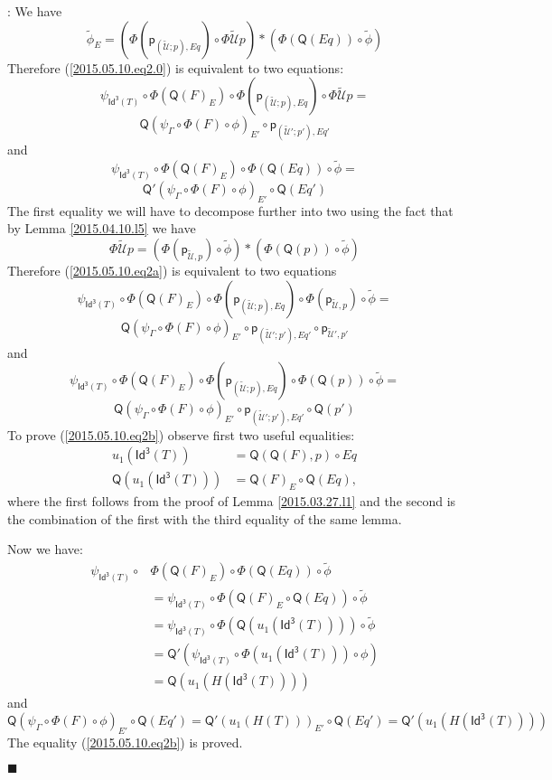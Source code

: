 \documentclass[12pt]{article}
\numberwithin{equation}{section}
\newenvironment{eq}{\begin{equation}}{\end{equation}}
\newenvironment{myproof}{{\bf Proof}:}{$\blacksquare$ \vskip 5mm }
\newcommand{\llabel}[1]{\label{#1}}
\newcommand{\wt}{\widetilde}
\newcommand{\p}{\mathsf{p}}
\newcommand{\Idx}{\mathsf{Id^3}} %
\newcommand{\U}{\mathcal{U}}
\newcommand{\Q}{\mathsf{Q}}
\begin{document}
\begin{myproof}
We have
%
$$\wt{\phi}_E=(\Phi(\p_{(\wt{\U};p),Eq})\circ
\Phi\wt{\U}p)*(\Phi(\Q(Eq))\circ\wt{\phi})$$
%
Therefore (\ref{2015.05.10.eq2.0}) is equivalent to two equations:
%
$$\psi_{\Idx(T)}\circ \Phi(\Q(F)_E)\circ \Phi(\p_{(\wt{\U};p),Eq})\circ
\Phi\wt{\U}p=$$
\begin{eq}
\label{2015.05.10.eq2a}
\Q(\psi_{\Gamma}\circ \Phi(F)\circ \phi)_{E'}\circ \p_{(\wt{\U}';p'),Eq'}
\end{eq}%
%
and
%
$$\psi_{\Idx(T)}\circ \Phi(\Q(F)_E)\circ \Phi(\Q(Eq))\circ\wt{\phi}=$$
\begin{eq}
\label{2015.05.10.eq2b}
\Q'(\psi_{\Gamma}\circ \Phi(F)\circ \phi)_{E'}\circ \Q(Eq')
\end{eq}%
%
The first equality we will have to decompose further into two using the fact
that by Lemma \ref{2015.04.10.l5} we have
%
$$\Phi\wt{\U}p=(\Phi(\p_{\wt{\U},p})\circ\wt{\phi})*(\Phi(\Q(p))\circ \wt{\phi})$$
%
Therefore (\ref{2015.05.10.eq2a}) is equivalent to two equations
%
$$\psi_{\Idx(T)}\circ \Phi(\Q(F)_E)\circ \Phi(\p_{(\wt{\U};p),Eq})\circ
\Phi(\p_{\wt{\U},p})\circ\wt{\phi}=$$
\begin{eq}
\llabel{2015.05.10.eq2aa} \Q(\psi_{\Gamma}\circ \Phi(F)\circ \phi)_{E'}\circ
\p_{(\wt{\U}';p'),Eq'}\circ \p_{\wt{\U}',p'}
\end{eq}%
%
and
%
$$\psi_{\Idx(T)}\circ \Phi(\Q(F)_E)\circ \Phi(\p_{(\wt{\U};p),Eq})\circ
\Phi(\Q(p))\circ\wt{\phi}=$$
\begin{eq}
\llabel{2015.05.10.eq2ab} \Q(\psi_{\Gamma}\circ \Phi(F)\circ \phi)_{E'}\circ
\p_{(\wt{\U}';p'),Eq'}\circ \Q(p')
\end{eq}%
%
To prove (\ref{2015.05.10.eq2b}) observe first two useful equalities:
%
\begin{align*}
  u_1(\Idx(T))&=\Q(\Q(F),p)\circ Eq \\
  \Q(u_1(\Idx(T)))&=\Q(F)_{E}\circ \Q(Eq),
\end{align*}
%
where the first follows from the proof of Lemma \ref{2015.03.27.l1} and the
second is the combination of the first with the third equality of the same
lemma.

Now we have:
%
\begin{align*}
  \psi_{\Idx(T)}\circ & \Phi(\Q(F)_E)\circ \Phi(\Q(Eq))\circ\wt{\phi} \\
    & = \psi_{\Idx(T)}\circ \Phi(\Q(F)_E\circ \Q(Eq))\circ\wt{\phi} \\
    & = \psi_{\Idx(T)}\circ \Phi(\Q(u_1(\Idx(T))))\circ \wt{\phi} \\
    & = \Q'(\psi_{\Idx(T)}\circ \Phi(u_1(\Idx(T)))\circ \phi) \\
    & = \Q(u_1(H(\Idx(T))))
\end{align*}
%
and
%
$$\Q(\psi_{\Gamma}\circ \Phi(F)\circ \phi)_{E'}\circ
\Q(Eq')=\Q'(u_1(H(T)))_{E'}\circ \Q(Eq')=\Q'(u_1(H(\Idx(T))))$$
%
The equality (\ref{2015.05.10.eq2b}) is proved.


\end{myproof}
\end{document}
